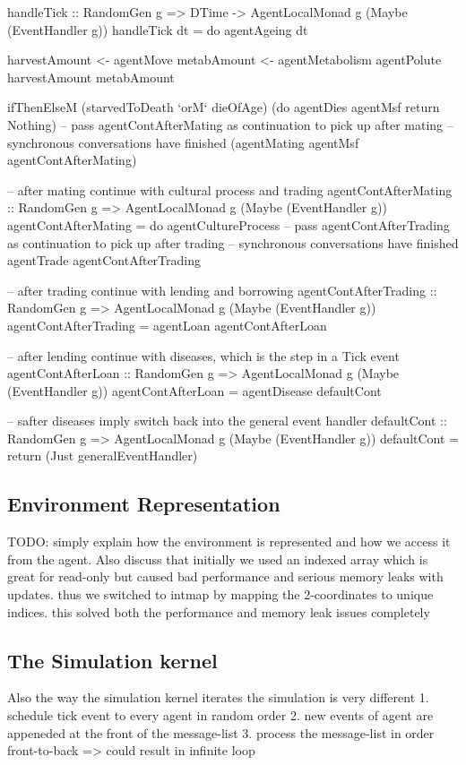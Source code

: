 \begin{HaskellCode}
handleTick :: RandomGen g => DTime -> AgentLocalMonad g (Maybe (EventHandler g))
handleTick dt = do
  agentAgeing dt
  
  harvestAmount <- agentMove
  metabAmount   <- agentMetabolism
  agentPolute harvestAmount metabAmount

  ifThenElseM
    (starvedToDeath `orM` dieOfAge)
    (do
      agentDies agentMsf
      return Nothing) 
    -- pass agentContAfterMating as continuation to pick up after mating
    -- synchronous conversations have finished
    (agentMating agentMsf agentContAfterMating)

-- after mating continue with cultural process and trading
agentContAfterMating :: RandomGen g => AgentLocalMonad g (Maybe (EventHandler g))
agentContAfterMating = do
    agentCultureProcess
    -- pass agentContAfterTrading as continuation to pick up after trading 
    -- synchronous conversations have finished
    agentTrade agentContAfterTrading 

-- after trading continue with lending and borrowing
agentContAfterTrading :: RandomGen g  => AgentLocalMonad g (Maybe (EventHandler g))
agentContAfterTrading = agentLoan agentContAfterLoan

-- after lending continue with diseases, which is the step in a Tick event
agentContAfterLoan :: RandomGen g => AgentLocalMonad g (Maybe (EventHandler g))
agentContAfterLoan = agentDisease defaultCont

-- safter diseases imply switch back into the general event handler
defaultCont :: RandomGen g => AgentLocalMonad g (Maybe (EventHandler g))
defaultCont = return (Just generalEventHandler)
\end{HaskellCode}

\subsection{Environment Representation}
TODO: simply explain how the environment is represented and how we access it from the agent. Also discuss that initially we used an indexed array which is great for read-only but caused bad performance and serious memory leaks with updates. thus we switched to intmap by mapping the 2-coordinates to unique indices. this solved both the performance and memory leak issues completely

\subsection{The Simulation kernel}
Also the way the simulation kernel iterates the simulation is very different
1. schedule tick event to every agent in random order
2. new events of agent are appeneded at the front of the message-list
3. process the message-list in order front-to-back => could result in infinite loop

